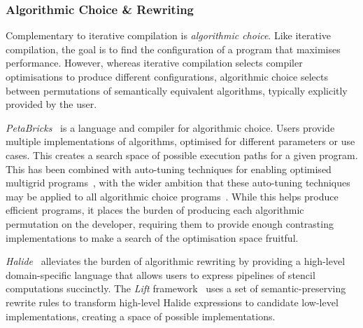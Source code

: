 \subsubsection{Algorithmic Choice \& Rewriting}

Complementary to iterative compilation is \emph{algorithmic choice}. Like iterative compilation, the goal is to find the configuration of a program that maximises performance. However, whereas iterative compilation selects compiler optimisations to produce different configurations, algorithmic choice selects between permutations of semantically equivalent algorithms, typically explicitly provided by the user.

\emph{PetaBricks}~\cite{Ansel2009a} is a language and compiler for algorithmic choice. Users provide multiple implementations of algorithms, optimised for different parameters or use cases. This creates a search space of possible execution paths for a given program. This has been combined with auto-tuning techniques for enabling optimised multigrid programs~\cite{Chan2009}, with the wider ambition that these auto-tuning techniques may be applied to all algorithmic choice programs~\cite{Ansel2014}. While this helps produce efficient programs, it places the burden of producing each algorithmic permutation on the developer, requiring them to provide enough contrasting implementations to make a search of the optimisation space fruitful.

\emph{Halide}~\cite{Ragan-Kelley2013} alleviates the burden of algorithmic rewriting by providing a high-level domain-specific language that allows users to express pipelines of stencil computations succinctly.
The \emph{Lift} framework~\cite{Steuwer2017} uses a set of semantic-preserving rewrite rules to transform high-level Halide expressions to candidate low-level implementations, creating a space of possible implementations.


